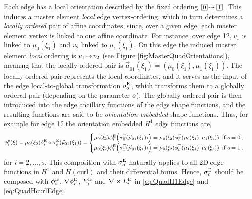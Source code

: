 Each edge has a local orientation described by the fixed ordering $\boxednum{0}\!\tdashto\boxednum{1}$.
This induces a master element \textit{local} edge vertex-ordering, which in turn determines a \textit{locally ordered} pair of affine coordinates, since, over a given edge, each master element vertex is linked to one affine coordinate.
For instance, over edge 12, $v_1$ is linked to $\mu_0(\xi_1)$ and $v_2$ linked to $\mu_1(\xi_1)$.
On this edge the induced master element \textit{local} ordering is $v_1\tdashto v_2$ (see Figure \ref{fig:MasterQuadOrientations}), meaning that the locally ordered pair is $\vec{\mu}_{01}(\xi_1)=(\mu_0(\xi_1),\mu_1(\xi_1))$.
The locally ordered pair represents the local coordinates, and it serves as the input of the edge local-to-global transformation $\sigma_o^{\mathrm{E}}$, which transforms them to a globally ordered pair (depending on the parameter $o$).
The globally ordered pair is then introduced into the edge ancillary functions of the edge shape functions, and the resulting functions are said to be \textit{orientation embedded} shape functions.
Thus, for example for edge 12 the orientation embedded $H^1$ edge functions are, 
\begin{equation*}
    \phi_i^\mathrm{e}(\xi)=\mu_0(\xi_2)\phi_i^{\mathrm{E}}\circ\sigma_o^{\mathrm{E}}(\vec{\mu}_{01}(\xi_1))
        =\begin{cases}
            \mu_0(\xi_2)\phi_i^{\mathrm{E}}\Big(\sigma_0^{\mathrm{E}}(\vec{\mu}_{01}(\xi_1))\Big)
            	=\mu_0(\xi_2)\phi_i^{\mathrm{E}}(\mu_0(\xi_1),\mu_1(\xi_1))\,\,\,\text{if }o=0\,,\\
            \mu_0(\xi_2)\phi_i^{\mathrm{E}}\Big(\sigma_1^{\mathrm{E}}(\vec{\mu}_{01}(\xi_1))\Big)
            	=\mu_0(\xi_2)\phi_i^{\mathrm{E}}(\mu_1(\xi_1),\mu_0(\xi_1))\,\,\,\text{if }o=1\,,
        \end{cases}
\end{equation*}
for $i=2,\ldots,p$.
This composition with $\sigma_o^{\mathrm{E}}$ naturally applies to all 2D edge functions in $H^1$ and $H(\mathrm{curl})$ and their differential forms. 
Hence, $\sigma_o^{\mathrm{E}}$ should be composed with $\phi_i^{\mathrm{E}}$, $\nabla\phi_i^{\mathrm{E}}$, $E_i^{\mathrm{E}}$ and $\nabla\times E_i^{\mathrm{E}}$ in \eqref{eq:QuadH1Edge} and \eqref{eq:QuadHcurlEdge}.


